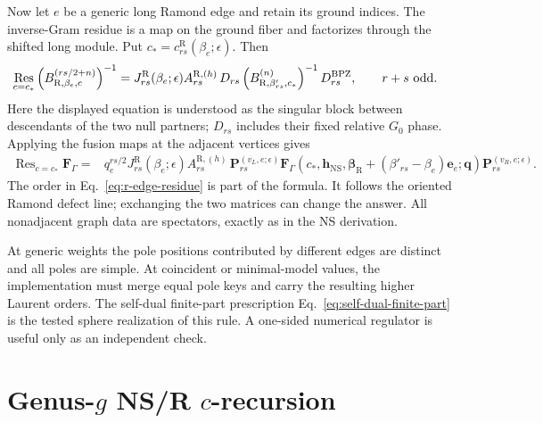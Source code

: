 \documentclass[11pt]{article}
\newcommand{\NS}{\mathrm{NS}}
\newcommand{\R}{\mathrm{R}}
\newcommand{\ve}{\bm e}
\DeclareMathOperator{\Res}{Res}
\begin{document}
Now let $e$ be a generic long Ramond edge and retain its ground indices.
The inverse-Gram residue is a map on the ground fiber and factorizes through
the shifted long module.  Put
\(c_*=c^{\R}_{rs}(\beta_e;\epsilon)\).  Then
\begin{equation}
 \label{eq:r-gram-residue}
\begin{aligned}
 \Res_{c=c_*}
 \left(B_{\R,\beta_e,c}^{(rs/2+n)}\right)^{-1}
 &=J^{\R}_{rs}(\beta_e;\epsilon)A^{\R,(h)}_{rs}\,
 D_{rs}
 \left(B_{\R,\beta'_{rs},c_*}^{(n)}\right)^{-1}
 D_{rs}^{\mathrm{BPZ}},
 \qquad r+s\ \hbox{odd}.
\end{aligned}
\end{equation}
Here the displayed equation is understood as the singular block between
descendants of the two null partners; $D_{rs}$ includes their fixed relative
$G_0$ phase.  Applying the fusion maps at the adjacent vertices gives
\begin{equation}
 \label{eq:r-edge-residue}
\begin{aligned}
 \Res_{c=c_*}
 \mathbf F_{\Gamma}
={}&q_e^{rs/2}J^{\R}_{rs}(\beta_e;\epsilon)
 A^{\R,(h)}_{rs}\,
 \mathbf P_{rs}^{(v_L,e;\epsilon)}
 \mathbf F_{\Gamma}
 \left(c_*,
 \boldsymbol h_{\NS},
 \boldsymbol\beta_{\R}+
 (\beta'_{rs}-\beta_e)\ve_e;\boldsymbol q\right)
 \mathbf P_{rs}^{(v_R,e;\epsilon)}.
\end{aligned}
\end{equation}
The order in Eq.~\eqref{eq:r-edge-residue} is part of the formula.  It
follows the oriented Ramond defect line; exchanging the two matrices can
change the answer.  All nonadjacent graph data are spectators, exactly as in
the NS derivation.

At generic weights the pole positions contributed by different edges are
distinct and all poles are simple.  At coincident or minimal-model values,
the implementation must merge equal pole keys and carry the resulting
higher Laurent orders.  The self-dual finite-part prescription
Eq.~\eqref{eq:self-dual-finite-part} is the tested sphere realization of this
rule.  A one-sided numerical regulator is useful only as an independent
check.

\section{\texorpdfstring{Genus-$g$ NS/R $c$-recursion}
{Genus-g NS/R c-recursion}}
\label{sec:recursion}
\end{document}
